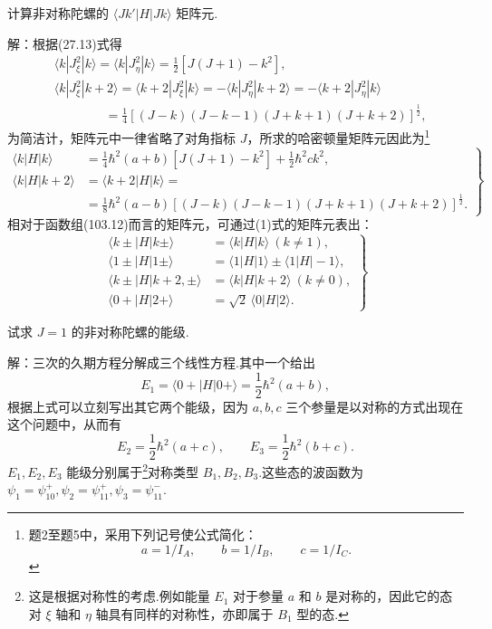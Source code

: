 \begin{xiti}
\quad 计算非对称陀螺的 $\langle Jk'|H|Jk\rangle$ 矩阵元.

解：根据(27.13)式得
\begin{equation*}
\begin{aligned}
  &\langle k|J_\xi^2|k\rangle=\langle k|J_\eta^2|k\rangle
  =\frac{1}{2}\left[J(J+1)-k^2\right],\\
  &\langle k|J_\xi^2|k+2\rangle=\langle k+2|J_\xi^2|k\rangle
  =-\langle k|J_\eta^2|k+2\rangle=-\langle k+2|J_\eta^2|k\rangle\\
  &\qquad\qquad=\frac{1}{4}\left[(J-k)(J-k-1)(J+k+1)(J+k+2)\right]^{\frac{1}{2}},
\end{aligned}
\end{equation*}
为简洁计，矩阵元中一律省略了对角指标 $J$，所求的哈密顿量矩阵元因此为\footnote{题2至题5中，采用下列记号使公式简化：
\begin{equation*}
  a=1/I_A,\qquad b=1/I_B,\qquad c=1/I_C.
\end{equation*}}
\begin{equation}
\left.\begin{aligned}
  \langle k|H|k\rangle&=\frac{1}{4}\hbar^2(a+b)\left[J(J+1)-k^2\right]
  +\frac{1}{2}\hbar^2ck^2,\\
  \langle k|H|k+2\rangle&=\langle k+2|H|k\rangle=\\
  &=\frac{1}{8}\hbar^2(a-b)
  \left[(J-k)(J-k-1)(J+k+1)(J+k+2)\right]^{\frac{1}{2}}.
\end{aligned}\right\}
\end{equation}
相对于函数组(103.12)而言的矩阵元，可通过(1)式的矩阵元表出：
\begin{equation}
\left.\begin{aligned}
  \langle k\pm|H|k\pm\rangle&=\langle k|H|k\rangle\ (k\neq1),\\
  \langle 1\pm|H|1\pm\rangle&=\langle 1|H|1\rangle\pm\langle 1|H|-1\rangle,\\
  \langle k\pm|H|k+2,\pm\rangle&=\langle k|H|k+2\rangle\ (k\neq0),\\
  \langle 0+|H|2+\rangle&=\sqrt{2}\,\langle 0|H|2\rangle.
\end{aligned}\right\}
\end{equation}

\quad 试求 $J=1$ 的非对称陀螺的能级.

解：三次的久期方程分解成三个线性方程.其中一个给出
\begin{equation}
  E_1=\langle 0+|H|0+\rangle=\frac{1}{2}\hbar^2(a+b),
\end{equation}
根据上式可以立刻写出其它两个能级，因为 $a,b,c$ 三个参量是以对称的方式出现在这个问题中，从而有
\begin{equation}
  E_2=\frac{1}{2}\hbar^2(a+c),\qquad
  E_3=\frac{1}{2}\hbar^2(b+c).
\end{equation}
$E_1,E_2,E_3$ 能级分别属于\footnote{这是根据对称性的考虑.例如能量 $E_1$ 对于参量 $a$ 和 $b$ 是对称的，因此它的态对 $\xi$ 轴和 $\eta$ 轴具有同样的对称性，亦即属于 $B_1$ 型的态.}对称类型 $B_1,B_2,B_3$.这些态的波函数为
$\psi_1=\psi^+_{10},\psi_2=\psi^+_{11},\psi_3=\psi^-_{11}$.


\end{xiti}
